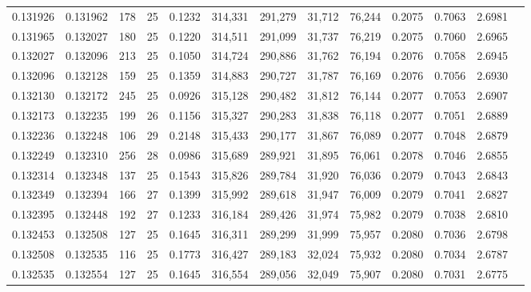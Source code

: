 \begin{tabular}{rrrrrrrrrrrrr}
0.131926 & 0.131962 & 178 &  25 &                                     0.1232 & 314,331 & 291,279 &  31,712 &  76,244 & 0.2075 & 0.7063 & 2.6981 \\
0.131965 & 0.132027 & 180 &  25 &                                     0.1220 & 314,511 & 291,099 &  31,737 &  76,219 & 0.2075 & 0.7060 & 2.6965 \\
0.132027 & 0.132096 & 213 &  25 &                                     0.1050 & 314,724 & 290,886 &  31,762 &  76,194 & 0.2076 & 0.7058 & 2.6945 \\
0.132096 & 0.132128 & 159 &  25 &                                     0.1359 & 314,883 & 290,727 &  31,787 &  76,169 & 0.2076 & 0.7056 & 2.6930 \\
0.132130 & 0.132172 & 245 &  25 &                                     0.0926 & 315,128 & 290,482 &  31,812 &  76,144 & 0.2077 & 0.7053 & 2.6907 \\
0.132173 & 0.132235 & 199 &  26 &                                     0.1156 & 315,327 & 290,283 &  31,838 &  76,118 & 0.2077 & 0.7051 & 2.6889 \\
0.132236 & 0.132248 & 106 &  29 &                                     0.2148 & 315,433 & 290,177 &  31,867 &  76,089 & 0.2077 & 0.7048 & 2.6879 \\
0.132249 & 0.132310 & 256 &  28 &                                     0.0986 & 315,689 & 289,921 &  31,895 &  76,061 & 0.2078 & 0.7046 & 2.6855 \\
0.132314 & 0.132348 & 137 &  25 &                                     0.1543 & 315,826 & 289,784 &  31,920 &  76,036 & 0.2079 & 0.7043 & 2.6843 \\
0.132349 & 0.132394 & 166 &  27 &                                     0.1399 & 315,992 & 289,618 &  31,947 &  76,009 & 0.2079 & 0.7041 & 2.6827 \\
0.132395 & 0.132448 & 192 &  27 &                                     0.1233 & 316,184 & 289,426 &  31,974 &  75,982 & 0.2079 & 0.7038 & 2.6810 \\
0.132453 & 0.132508 & 127 &  25 &                                     0.1645 & 316,311 & 289,299 &  31,999 &  75,957 & 0.2080 & 0.7036 & 2.6798 \\
0.132508 & 0.132535 & 116 &  25 &                                     0.1773 & 316,427 & 289,183 &  32,024 &  75,932 & 0.2080 & 0.7034 & 2.6787 \\
0.132535 & 0.132554 & 127 &  25 &                                     0.1645 & 316,554 & 289,056 &  32,049 &  75,907 & 0.2080 & 0.7031 & 2.6775 \\

\end{tabular}
